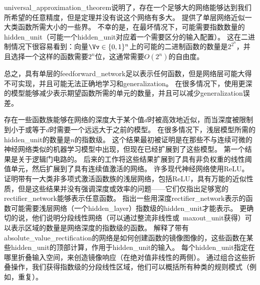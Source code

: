 \gls{universal_approximation_theorem}说明了，存在一个足够大的网络能够达到我们所希望的任意精度，但是定理并没有说这个网络有多大。
\cite{Barron-1993}提供了单层网络近似一大类函数所需大小的一些界。
不幸的是，在最坏情况下，可能需要指数数量的\gls{hidden_unit}（可能一个\gls{hidden_unit}对应着一个需要区分的输入配置）。
这在二进制情况下很容易看到：向量$\Vv\in \{0,1\}^n$上的可能的二进制函数的数量是$2^{2^n}$，并且选择一个这样的函数需要$2^n$位，这通常需要$O(2^n)$的自由度。

总之，具有单层的\gls{feedforward_network}足以表示任何函数，但是网络层可能大得不可实现，并且可能无法正确地学习和\gls{generalization}。
在很多情况下，使用更深的模型能够减少表示期望函数所需的单元的数量，并且可以减少\gls{generalization}误差。


存在一些函数族能够在网络的深度大于某个值$d$时被高效地近似，而当深度被限制到小于或等于$d$时需要一个远远大于之前的模型。
在很多情况下，浅层模型所需的\gls{hidden_unit}的数量是$n$的指数级。
这个结果最初被证明是在那些不与连续可微的神经网络类似的机器学习模型中出现，但现在已经扩展到了这些模型。
第一个结果是关于逻辑门电路的\citep{Hastad-1986}。
后来的工作将这些结果扩展到了具有非负权重的线性阈值单元\citep{Hastad-Goldmann-1991,Hajnal-et-al-1993}，然后扩展到了具有连续值激活的网络\citep{Maass-1992,Maass-et-al-1994}。
许多现代神经网络使用\gls{ReLU}。
\cite{Leshno-et-al-1993}证明带有一大类非多项式激活函数族的浅层网络，包括\gls{ReLU}，具有万能的近似性质，但是这些结果并没有强调深度或效率的问题——它们仅指出足够宽的\gls{rectifier_network}能够表示任意函数。
\cite{Montufar-et-al-2014}指出一些用深度\gls{rectifier_network}表示的函数可能需要浅层网络（一个\gls{hidden_layer}）指数级的\gls{hidden_unit}才能表示。
更确切的说，他们说明分段线性网络（可以通过整流非线性或~\gls{maxout_unit}获得）可以表示区域的数量是网络深度的指数级的函数。%
解释了带有\gls{absolute_value_rectification}的网络是如何创建函数的镜像图像的，这些函数在某些\gls{hidden_unit}的顶部计算，作用于\gls{hidden_unit}的输入。
每个\gls{hidden_unit}指定在哪里折叠输入空间，来创造镜像响应（在绝对值非线性的两侧）。
通过组合这些折叠操作，我们获得指数级的分段线性区域，他们可以概括所有种类的规则模式（例如，重复）。
